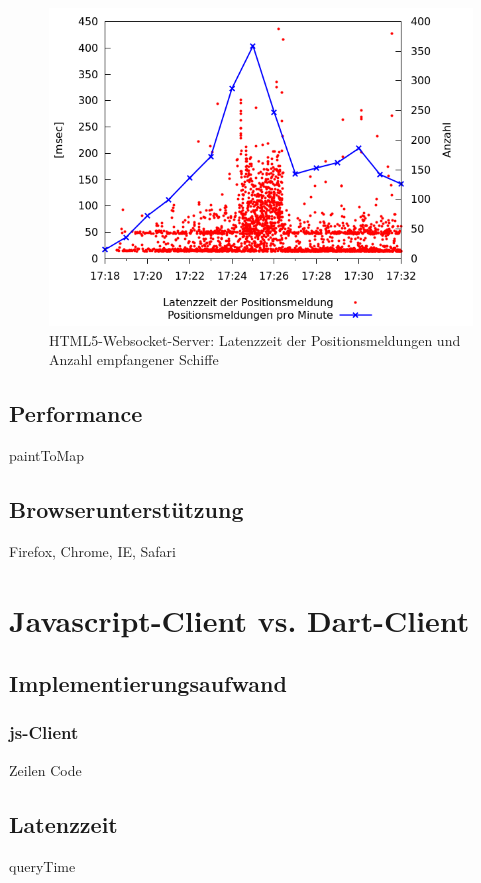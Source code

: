 \begin {figure}[H]
\begin{center}
  \includegraphics[width=4.5in]{images/latency_timeReceived_HTML5.png}
\end{center}
\caption{HTML5-Websocket-Server: Latenzzeit der Positionsmeldungen und Anzahl empfangener Schiffe}
\end {figure}


\subsection{Performance}
paintToMap

\subsection{Browserunterstützung}
Firefox, Chrome, IE, Safari


\section{Javascript-Client vs. Dart-Client} 
\subsection{Implementierungsaufwand}

\subsubsection{js-Client}
Zeilen Code



\subsection{Latenzzeit}
queryTime


